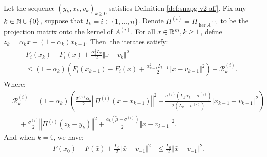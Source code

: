 \documentclass[12pt]{article}
\begin{document}
    \begin{lemma}\;\label{lemma:snapg2-one-step-s1}\\
        Let the sequence $(y_k, x_k, v_k)_{k \ge 0}$ satisfies Definition \ref{def:snapg-v2-aff}. 
        Fix any $k \in \mathbb N \cup\{0\}$, suppose that $I_k = i \in \{1, \ldots, n\}$.
        Denote $\Pi^{(i)} = \Pi_{\ker A^{(i)}}$ to be the projection matrix onto the kernel of $A^{(i)}$. 
        For all $\bar x \in \mathbb R^m, k \ge 1$, define $z_k = \alpha_k \bar x + (1 - \alpha_k)x_{k - 1}$. 
        Then, the iterates satisfy: 
        \begin{align}\label{ineq:snapg2-one-step-s1-rslt1}
            \begin{split}
                & F_i(x_k) - F_i(\bar x)
                + \frac{\alpha_k^2L_k}{2}\Vert \bar x - v_k\Vert^2
                \\&\le 
                (1 - \alpha_k)\left(
                    F_i(x_{k - 1}) - F_i(\bar x) + \frac{\alpha_{k - 1}^2L_{k - 1}}{2} \Vert \bar x - v_{k - 1}\Vert^2
                \right) + \mathcal R_k^{(i)}. 
            \end{split}
        \end{align}
        Where: 
        \begin{align*}
            & \mathcal R_k^{(i)} = (1 - \alpha_k)\left(
                \frac{\sigma^{(i)}\alpha_k}{2}\left\Vert \Pi^{(i)} (\bar x - x_{k - 1})\right\Vert^2
                - \frac{\sigma^{(i)}\left(L_k\alpha_k - \sigma^{(i)}\right)}{2\left(L_k - \sigma^{(i)}\right)}\Vert x_{k - 1} - v_{k - 1} \Vert^2
            \right)
                \\&\quad
                + \frac{\sigma^{(i)}}{2}\left\Vert \Pi^{(i)}(z_k - y_k)\right\Vert^2
                + \frac{\alpha_k(\tilde\mu - \sigma^{(i)})}{2} \Vert \bar x - v_{k - 1}\Vert^2. 
        \end{align*}
        And when $k = 0$, we have: 
        \begin{align}\label{ineq:snapg2-one-step-s1-rslt2}
            F(x_0) - F(\bar x) + \frac{L_0}{2}\Vert \bar x - v_{-1}\Vert^2 
            &\le \frac{L_0}{2}\Vert \bar x - v_{-1}\Vert^2. 
        \end{align}
    \end{lemma}
\end{document}
